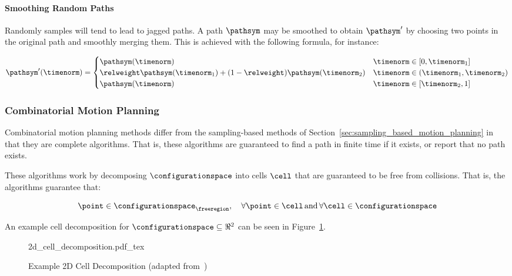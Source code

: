 			\paragraph{Smoothing Random Paths}%
			\label{sec:smoothing_random_paths}

				Randomly samples will tend to lead to jagged paths. A path
				$\pathsym$ may be smoothed to obtain $\pathsym'$ by choosing two
				points in the original path and smoothly merging them. This is
				achieved with the following formula, for instance:

				\begin{equation}
					\pathsym'(\timenorm) =
						\begin{cases}
							\pathsym(\timenorm) & \timenorm\in[0, \timenorm_1]\\
							\relweight\pathsym(\timenorm_1) +
								(1-\relweight)\pathsym(\timenorm_2)
							& \timenorm\in(\timenorm_1,\timenorm_2)\\
							\pathsym(\timenorm) & \timenorm\in[\timenorm_2, 1]\\
						\end{cases}
				\end{equation}
		\subsubsection{Combinatorial Motion Planning}%
		\label{sec:combinatorial_motion_planning}

			Combinatorial motion planning methods differ from the sampling-based
			methods of Section~\ref{sec:sampling_based_motion_planning} in that
			they are complete algorithms. That is, these algorithms are
			guaranteed to find a path in finite time if it exists, or report
			that no path exists.

			These algorithms work by decomposing $\configurationspace$ into
			cells $\cell$ that are guaranteed to be free from collisions. That
			is, the algorithms guarantee that:

			\begin{equation}
				\point\in\configurationspace_{\freeregion},
				\quad
				\forall\point\in\cell \, \text{and} \, \forall\cell\in\configurationspace
			\end{equation}

			An example cell decomposition for $\configurationspace\subseteq\Re^2$ can be seen
			in Figure~\ref{fig:example_2d_cell_decomposition}.

			\begin{figure}[hb]
				\centering
				\def\svgwidth{\columnwidth}
				{2d_cell_decomposition.pdf_tex}
				\caption[Example 2D Cell Decomposition]
				{%
					Example 2D Cell Decomposition
					(adapted from~\cite[][page 269]
						{bib:planning:planning_algorithms})
				}%
				\label{fig:example_2d_cell_decomposition}
			\end{figure}

